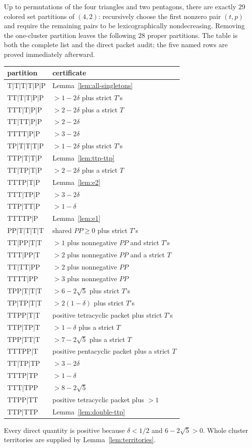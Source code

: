 \documentclass[11pt]{article}
\begin{document}
Up to permutations of the four triangles and two pentagons, there are exactly
$29$ colored set partitions of $(4,2)$: recursively choose the first nonzero
pair $(t,p)$ and require the remaining pairs to be lexicographically
nondecreasing.  Removing the one-cluster partition leaves the following
$28$ proper partitions.  The table is both the complete list and the direct
packet audit; the five named rows are proved immediately afterward.
\begin{center}
\renewcommand{\arraystretch}{1.09}
\begin{tabular}{>{\ttfamily}l l}
partition & certificate\\ \hline
T|T|T|T|P|P & Lemma~\ref{lem:all-singletons}\\
TT|T|T|P|P & $>1-2\delta$ plus strict $T$'s\\
TTT|T|P|P & $>2-2\delta$ plus a strict $T$\\
TT|TT|P|P & $>2-2\delta$\\
TTTT|P|P & $>3-2\delta$\\
TP|T|T|T|P & $>1-2\delta$ plus strict $T$'s\\
TTP|T|T|P & Lemma~\ref{lem:ttp-ttp}\\
TT|TP|T|P & $>2-2\delta$ plus a strict $T$\\
TTTP|T|P & Lemma~\ref{lem:e2}\\
TTT|TP|P & $>3-2\delta$\\
TTP|TT|P & $>1-\delta$\\
TTTTP|P & Lemma~\ref{lem:e1}\\
PP|T|T|T|T & shared $PP\geq0$ plus strict $T$'s\\
TT|PP|T|T & $>1$ plus nonnegative $PP$ and strict $T$'s\\
TTT|PP|T & $>2$ plus nonnegative $PP$ and a strict $T$\\
TT|TT|PP & $>2$ plus nonnegative $PP$\\
TTTT|PP & $>3$ plus nonnegative $PP$\\
TPP|T|T|T & $>6-2\sqrt5$ plus strict $T$'s\\
TP|TP|T|T & $>2(1-\delta)$ plus strict $T$'s\\
TTPP|T|T & positive tetracyclic packet plus strict $T$'s\\
TTP|TP|T & $>1-\delta$ plus a strict $T$\\
TPP|TT|T & $>7-2\sqrt5$ plus a strict $T$\\
TTTPP|T & positive pentacyclic packet plus a strict $T$\\
TT|TP|TP & $>3-2\delta$\\
TTTP|TP & $>1-\delta$\\
TTT|TPP & $>8-2\sqrt5$\\
TTPP|TT & positive tetracyclic packet plus $>1$\\
TTP|TTP & Lemma~\ref{lem:double-ttp}
\end{tabular}
\end{center}
Every direct quantity is positive because $\delta<1/2$ and
$6-2\sqrt5>0$.  Whole cluster territories are supplied by
Lemma~\ref{lem:territories}.
\end{document}
